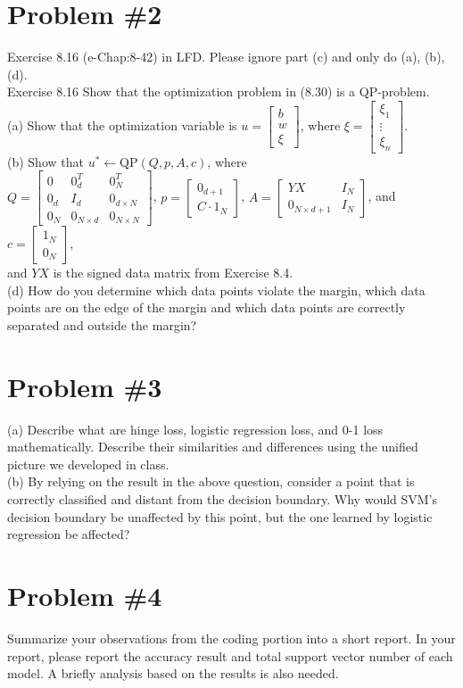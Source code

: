 \documentclass[12pt]{article}
\begin{document}
	\section*{Problem \#2}
	Exercise 8.16 (e-Chap:8-42) in LFD. Please ignore part (c) and only do (a), (b), (d). \\
	Exercise 8.16
	Show that the optimization problem in (8.30) is a QP-problem. \\
	(a) Show that the optimization variable is 
	$u =\left[\begin{array}{c}
		b\\
		w\\
		\xi
	\end{array}\right]$, where $\xi =\left[\begin{array}{c}
	\xi_1\\
	\vdots\\
	\xi_n
	\end{array}\right]$. \\
	(b) Show that $u^* \leftarrow \text{QP}(Q,p,A,c)$, where \\
	$Q =\left[\begin{array}{ccc}
	0&0_d^T&0_N^T\\
	0_d&I_d&0_{d \times N}\\
	0_N&0_{N \times d}&0_{N \times N}
	\end{array}\right]$, $p =\left[\begin{array}{c}
	0_{d+1} \\
	C \cdot 1_N
	\end{array} \right]$, $A =\left[\begin{array}{cc}
	YX&I_N\\
	0_{N \times d+1}&I_N
	\end{array}\right]$, and $c =\left[\begin{array}{c}
	1_N \\
	0_N
	\end{array} \right]$,\\
	and $YX$ is the signed data matrix from Exercise 8.4. \\
	(d) How do you determine which data points violate the margin, which data points are on the edge of the margin and which data points are correctly separated and outside the margin?
		
	\section*{Problem \#3}
	(a) Describe what are hinge loss, logistic regression loss, and 0-1 loss mathematically. Describe their similarities and differences using the unified picture we developed in class. \\
	(b) By relying on the result in the above question, consider a point that is correctly classified and distant from the decision boundary. Why would SVM’s decision boundary be unaffected by this point, but the one learned by logistic regression be affected?
	
	\section*{Problem \#4}
	Summarize your observations from the coding portion into a short report. In your report, please report the accuracy result and total support vector number of each model. A briefly analysis based on the results is also needed.
	
	
\end{document}
